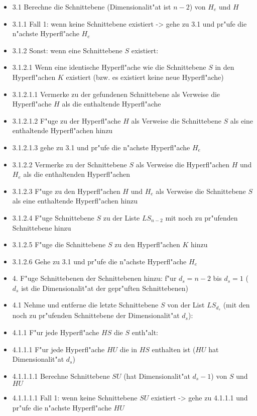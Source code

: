 \begin{itemize}
 \item [] 3.1 Berechne die Schnittebene (Dimensionalit"at ist $n-2$) von $H_e$ und $H$
 \item [] 3.1.1 Fall 1: wenn keine Schnittebene existiert -> gehe zu 3.1 und pr"ufe die n"achste Hyperfl"ache $H_e$
 \item [] 3.1.2 Sonst: wenn eine Schnittebene $S$ existiert:
 \item [] 3.1.2.1 Wenn eine identische Hyperfl"ache wie die Schnittebene $S$ in den Hyperfl"achen $K$ existiert (bzw. es existiert keine neue Hyperfl"ache) 
 \item [] 3.1.2.1.1 Vermerke zu der gefundenen Schnittebene als Verweise die Hyperfl"ache $H$ als die enthaltende Hyperfl"ache
 \item [] 3.1.2.1.2 F"uge zu der Hyperfl"ache $H$ als Verweise die Schnittebene $S$ als eine enthaltende Hyperfl"achen hinzu
 \item [] 3.1.2.1.3 gehe zu 3.1 und pr"ufe die n"achste Hyperfl"ache $H_e$
 \item [] 3.1.2.2 Vermerke zu der Schnittebene $S$ als Verweise die Hyperfl"achen $H$ und $H_e$ als die enthaltenden Hyperfl"achen
 \item [] 3.1.2.3 F"uge zu den Hyperfl"achen $H$ und $H_e$ als Verweise die Schnittebene $S$ als eine enthaltende Hyperfl"achen hinzu
 \item [] 3.1.2.4 F"uge Schnittebene $S$ zu der Liste $LS_{n-2}$ mit noch zu pr"ufenden Schnittebene hinzu
 \item [] 3.1.2.5 F"uge die Schnittebene $S$ zu den Hyperfl"achen $K$ hinzu
 \item [] 3.1.2.6 Gehe zu 3.1 und pr"ufe die n"achste Hyperfl"ache $H_e$
 \item [] 4. F"uge Schnittebenen der Schnittebenen hinzu: f"ur $d_s={n-2}$ bis $d_s={1}$ ($d_s$ ist die Dimensionalit"at der gepr"uften Schnittebenen)
 \item [] 4.1 Nehme und entferne die letzte Schnittebene $S$ von der List $LS_{d_s}$ (mit den noch zu pr"ufenden Schnittebene der Dimensionalit"at $d_s$):
 \item [] 4.1.1 F"ur jede Hyperfl"ache $HS$ die $S$ enth"alt:
 \item [] 4.1.1.1 F"ur jede Hyperfl"ache $HU$ die in $HS$ enthalten ist ($HU$ hat Dimensionalit"at $d_s$)
 \item [] 4.1.1.1.1 Berechne Schnittebene $SU$ (hat Dimensionalit"at $d_s-1$) von $S$ und $HU$
 \item [] 4.1.1.1.1 Fall 1: wenn keine Schnittebene $SU$ existiert -> gehe zu 4.1.1.1 und pr"ufe die n"achste Hyperfl"ache $HU$

\end{itemize}
